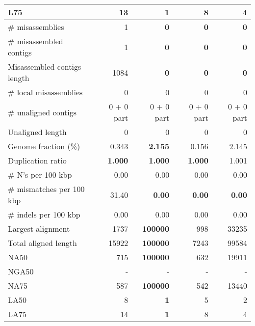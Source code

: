 \documentclass[12pt,a4paper]{article}
\begin{document}
\begin{table}[ht]
\begin{center}
\begin{tabular}{|l*{4}{|r}|}
L75 & 13 & {\bf 1} & 8 & 4 \\ \hline
\# misassemblies & 1 & {\bf 0} & {\bf 0} & {\bf 0} \\ \hline
\# misassembled contigs & 1 & {\bf 0} & {\bf 0} & {\bf 0} \\ \hline
Misassembled contigs length & 1084 & {\bf 0} & {\bf 0} & {\bf 0} \\ \hline
\# local misassemblies & 0 & 0 & 0 & 0 \\ \hline
\# unaligned contigs & 0 + 0 part & 0 + 0 part & 0 + 0 part & 0 + 0 part \\ \hline
Unaligned length & 0 & 0 & 0 & 0 \\ \hline
Genome fraction (\%) & 0.343 & {\bf 2.155} & 0.156 & 2.145 \\ \hline
Duplication ratio & {\bf 1.000} & {\bf 1.000} & {\bf 1.000} & 1.001 \\ \hline
\# N's per 100 kbp & 0.00 & 0.00 & 0.00 & 0.00 \\ \hline
\# mismatches per 100 kbp & 31.40 & {\bf 0.00} & {\bf 0.00} & {\bf 0.00} \\ \hline
\# indels per 100 kbp & 0.00 & 0.00 & 0.00 & 0.00 \\ \hline
Largest alignment & 1737 & {\bf 100000} & 998 & 33235 \\ \hline
Total aligned length & 15922 & {\bf 100000} & 7243 & 99584 \\ \hline
NA50 & 715 & {\bf 100000} & 632 & 19911 \\ \hline
NGA50 & - & - & - & - \\ \hline
NA75 & 587 & {\bf 100000} & 542 & 13440 \\ \hline
LA50 & 8 & {\bf 1} & 5 & 2 \\ \hline
LA75 & 14 & {\bf 1} & 8 & 4 \\ \hline
\end{tabular}
\end{center}
\end{table}
\end{document}
